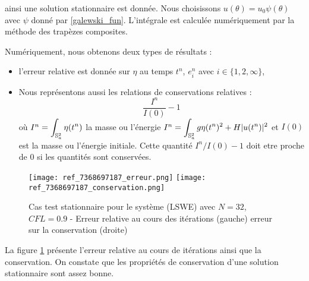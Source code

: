 ainsi une solution stationnaire est donnée. Nous choisissons $u(\theta) = u_0 \psi( \theta )$ avec $\psi$ donné par \eqref{galewski_fun}. L'intégrale est calculée numériquement par la méthode des trapèzes composites.

Numériquement, nous obtenons deux types de résultats :
\begin{itemize}
\item  l'erreur relative est donnée sur $\eta$ au temps $t^n$, $e_i^n$ avec $i \in \lbrace 1, 2, \infty \rbrace$,
\item Nous représentons aussi les relations de conservations relatives :
\begin{equation}
\dfrac{I^n}{I(0)}-1
\end{equation}
où  $I^n = \displaystyle\int_{\mathbb{S}_a^2} \eta (t^n)$ la masse ou l'énergie $I^n = \displaystyle\int_{\mathbb{S}_a^2} g \eta (t^n)^2 + H |u(t^n) |^2$ et $I(0)$ est la masse ou l'énergie initiale. Cette quantité $I^n/I(0)-1$ doit etre proche de $0$ si les quantités sont conservées.
\end{itemize} 

\begin{figure}[ht!]
\begin{center}
\texttt{[image: ref\_7368697187\_erreur.png]}
\texttt{[image: ref\_7368697187\_conservation.png]}
\caption{Cas test stationnaire pour le système (LSWE) avec $N=32$, $CFL=0.9$ - Erreur relative au cours des itérations (gauche) erreur sur la conservation (droite)}
\label{fig:err and cons lswe2}
\end{center}
\end{figure}

La figure \ref{fig:err and cons lswe2} présente l'erreur relative au cours de itérations ainsi que la conservation. On constate que les propriétés de conservation d'une solution stationnaire sont assez bonne. 